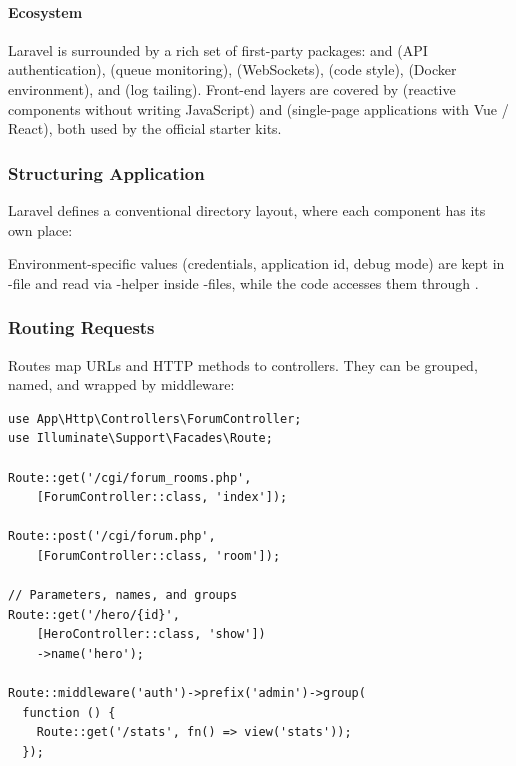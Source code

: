 \paragraph{Ecosystem} Laravel is surrounded by a rich set of first-party packages: 
and  (API authentication),  (queue monitoring),  (WebSockets),
 (code style),  (Docker environment), and  (log tailing). Front-end
layers are covered by  (reactive components without writing JavaScript) and
 (single-page applications with Vue / React), both used by the official starter
kits.


\subsubsection{Structuring Application}

Laravel defines a conventional directory layout, where each component has its own place:


\noindent Environment-specific values (credentials, application id, debug mode) are kept in
-file and read via -helper inside -files, while the code accesses
them through .


\subsubsection{Routing Requests}

Routes map URLs and HTTP methods to controllers. They can be grouped, named, and wrapped by
middleware:

\begin{lstlisting}
use App\Http\Controllers\ForumController;
use Illuminate\Support\Facades\Route;

Route::get('/cgi/forum_rooms.php',
    [ForumController::class, 'index']);

Route::post('/cgi/forum.php',
    [ForumController::class, 'room']);

// Parameters, names, and groups
Route::get('/hero/{id}',
    [HeroController::class, 'show'])
    ->name('hero');

Route::middleware('auth')->prefix('admin')->group(
  function () {
    Route::get('/stats', fn() => view('stats'));
  });
\end{lstlisting}

